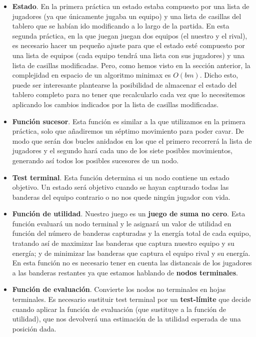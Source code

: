 \begin{itemize}
\item \textbf{Estado}. En la primera práctica un estado estaba
  compuesto por una lista de jugadores (ya que únicamente jugaba un
  equipo) y una lista de casillas del tablero que se habían ido
  modificando a lo largo de la partida. En esta segunda práctica, en
  la que juegan juegan dos equipos (el nuestro y el rival), es
  necesario hacer un pequeño ajuste para que el estado esté compuesto
  por una lista de equipos (cada equipo tendrá una lista con sus
  jugadores) y una lista de casillas modificadas. Pero, como hemos
  visto en la sección anterior, la complejidad en espacio de un
  algoritmo minimax es $O(bm)$. Dicho esto, puede ser interesante
  plantearse la posibilidad de almacenar el estado del tablero
  completo para no tener que recalcularlo cada vez que lo necesitemos
  aplicando los cambios indicados por la lista de casillas modificadas.
\item \textbf{Función sucesor}. Esta función es similar a la que
  utilizamos en la primera práctica, solo que añadiremos un séptimo
  movimiento para poder cavar. De modo que serán dos bucles anidados
  en los que el primero recorrerá la lista de jugadores y el segundo
  hará cada uno de los siete posibles movimientos, generando así todos
  los posibles sucesores de un nodo.
\item \textbf{Test terminal}. Esta función determina si un nodo contiene un
estado objetivo. Un estado será objetivo cuando se hayan capturado
todas las banderas del equipo contrario o no nos quede ningún jugador
con vida.
\item \textbf{Función de utilidad}. Nuestro juego es un \textbf{juego de
  suma no cero}. Esta función evaluará un nodo terminal y le asignará
un valor de utilidad en función del número de banderas capturadas y
la energía total de cada equipo, tratando así de maximizar las
banderas que captura nuestro equipo y su energía; y de minimizar las
banderas que captura el equipo rival y su energía. En esta función no
es necesario tener en cuenta las distancais de los jugadores a las
banderas restantes ya que estamos hablando de \textbf{nodos terminales}.
\item \textbf{Función de evaluación}. Convierte los nodos no terminales en
hojas terminales. Es necesario sustituir test terminal por un
\textbf{test-límite} que decide cuando aplicar la función de
evaluación (que sustituye a la función de utilidad), que nos devolverá
una estimación de la utilidad esperada de una posición dada.
\end{itemize}

